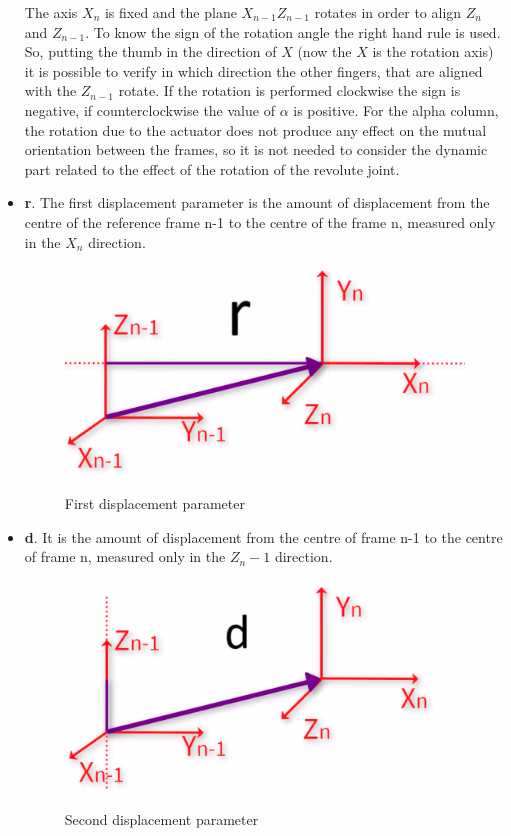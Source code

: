 \begin{itemize}
    The axis $X_n$ is fixed and the plane $X_{n-1}Z_{n-1}$ rotates in order to align $Z_n$ and $Z_{n-1}$. To know the sign of the rotation angle the right hand rule is used. So, putting the thumb in the direction of $X$ (now the $X$ is the rotation axis) it is possible to verify in which direction the other fingers, that are aligned with the $Z_{n-1}$ rotate. If the rotation is performed clockwise the sign is negative, if counterclockwise the value of $\alpha$ is positive. For the alpha column, the rotation due to the actuator does not produce any effect on the mutual orientation between the frames, so it is not needed to consider the dynamic part related to the effect of the rotation of the revolute joint.
    \item \textbf{r}. The first displacement parameter is the amount of displacement from the centre of the reference frame n-1 to the centre of the frame n, measured only in the $X_n$ direction.
    \begin{figure}[!h]
    \begin{center}
    \includegraphics[width=0.5\linewidth]{capitolo3/figure/r.png}
    \caption{First displacement parameter}
    \label{fig:r}
    \end{center}
    \end{figure}
    
    \item \textbf{d}. It is the amount of displacement from the centre of frame n-1 to the centre of frame n, measured only in the $Z_n-1$ direction.
    \begin{figure}[!h]
    \begin{center}
    \includegraphics[width=0.5\linewidth]{capitolo3/figure/d.png}
    \caption{Second displacement parameter}
    \label{fig:d}
    \end{center}
    \end{figure}
\end{itemize}

